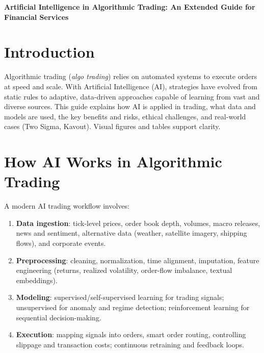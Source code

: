 \documentclass[12pt]{article}
\begin{document}
\begin{center}
   \LARGE{\textbf{Artificial Intelligence in Algorithmic Trading: 
An Extended Guide for Financial Services}} 
\end{center}

\section*{Introduction}
Algorithmic trading (\emph{algo trading}) relies on automated systems to execute orders at speed and scale. With Artificial Intelligence (AI), strategies have evolved from static rules to adaptive, data-driven approaches capable of learning from vast and diverse sources. This guide explains how AI is applied in trading, what data and models are used, the key benefits and risks, ethical challenges, and real-world cases (Two Sigma, Kavout). Visual figures and tables support clarity.

\section*{How AI Works in Algorithmic Trading}
A modern AI trading workflow involves:
\begin{enumerate}[leftmargin=*,itemsep=2pt]
  \item \textbf{Data ingestion}: tick-level prices, order book depth, volumes, macro releases, news and sentiment, alternative data (weather, satellite imagery, shipping flows), and corporate events.
  \item \textbf{Preprocessing}: cleaning, normalization, time alignment, imputation, feature engineering (returns, realized volatility, order-flow imbalance, textual embeddings).
  \item \textbf{Modeling}: supervised/self-supervised learning for trading signals; unsupervised for anomaly and regime detection; reinforcement learning for sequential decision-making.
  \item \textbf{Execution}: mapping signals into orders, smart order routing, controlling slippage and transaction costs; continuous retraining and feedback loops.
\end{enumerate}
\end{document}
